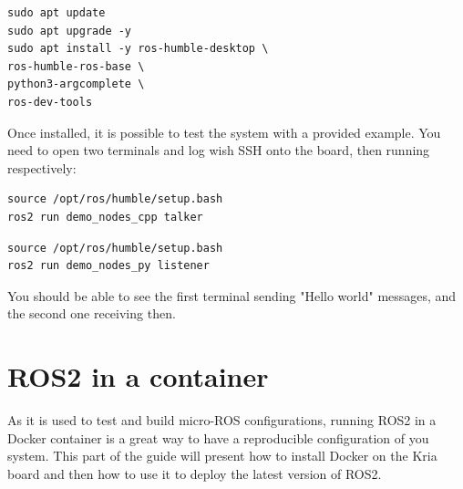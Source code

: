 \documentclass[10pt]{article}
\begin{document}
\begin{tcolorbox}
\begin{verbatim}
sudo apt update
sudo apt upgrade -y
sudo apt install -y ros-humble-desktop \
ros-humble-ros-base \
python3-argcomplete \
ros-dev-tools
\end{verbatim}
\end{tcolorbox}

Once installed, it is possible to test the system with a provided example. You need to open two terminals and log wish SSH onto the board, then running respectively:

\begin{tcolorbox}
\begin{verbatim}
source /opt/ros/humble/setup.bash
ros2 run demo_nodes_cpp talker
\end{verbatim}
\end{tcolorbox}



\begin{tcolorbox}
\begin{verbatim}
source /opt/ros/humble/setup.bash
ros2 run demo_nodes_py listener
\end{verbatim}
\end{tcolorbox}


You should be able to see the first terminal sending "Hello world" messages, and the second one receiving then.


\section{ROS2 in a container}
\label{sec:ros2-container}
As it is used to test and build micro-ROS configurations, running ROS2 in a Docker container is a great way to have a reproducible configuration
of you system. This part of the guide will present how to install Docker on the Kria board and then how to use it to deploy the latest
version of ROS2.
\end{document}
